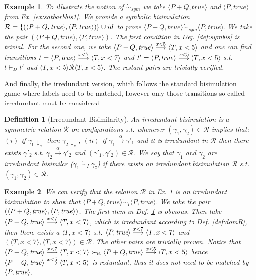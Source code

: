 \documentclass[copyright,creativecommons]{eptcs}
\newcommand{\true}{{\it true}}
\newcommand{\rrarrow}{\longrightarrow}
\newcommand{\pairccp}[2]{\langle #1,#2 \rangle}
\newcommand{\trans}[1]{\stackrel{#1}{\rrarrow}}
\newtheorem{definition}{Definition}
\newtheorem{example}{Example}
\newcommand{\R}{\mathcal{R}}
\newcommand{\A}{\alpha}
\newcommand{\conf}[2]{\pairccp{#1}{#2}}
\newcommand{\deriv}{\vdash_D}
\newcommand{\domR}{\succ_{\R}}
\newcommand{\irrbis}{\dot{\sim}_{I}}
\newcommand{\symbis}{\dot{\sim}_{sym}}
\begin{document}
\begin{example}\label{ex:symbis1}
\emph{To illustrate the notion of $\symbis$ we take $\pairccp{P+Q}{true}$ and $\pairccp{P}{true}$ from  Ex. \ref{ex:satbarbbis1}. We provide a symbolic bisimulation $\mathcal{R} = \{(\pairccp{P + Q}{\true},\pairccp{P}{\true})\} \cup id$ to prove $\pairccp{P+Q}{true} \symbis \pairccp{P}{true}.$  We take the pair $(\pairccp{P+Q}{true},\pairccp{P}{true})$. The first condition in Def. \ref{def:symbis} is trivial. For the second one, we take $\pairccp{P + Q}{\true} \trans{x<5} \pairccp{T}{x<5}$ and one can find transitions $t = \pairccp{P}{\true} \trans{x<7} \pairccp{T}{x<7}$ and $t' = \pairccp{P}{\true} \trans{x<5} \pairccp{T}{x<5}$ s.t. $t \deriv t'$ and $\conf{T}{x<5} \R \conf{T}{x<5}$. The restant pairs are trivially verified.}
\end{example}





And finally, the irredundant version, which follows the standard bisimulation
game where labels need to be matched, however only those transitions
so-called irredundant must be considered.

\begin{definition}[Irredundant Bisimilarity]
\label{def:irrbis}
An irredundant bisimulation is a symmetric relation
$\R$ on configurations s.t. whenever
$(\gamma_1, \gamma_2) \in \R$ implies that:
$(i)$ if $\gamma_1 \downarrow_e$ then $\gamma_2 \downarrow_e$,
$(ii)$ if $\gamma_1 \trans{\A} \gamma'_1$ and it is irredundant in $\R$ then there exists $\gamma'_2$ s.t. $\gamma_2 \trans{\A} \gamma'_2$ and $(\gamma'_1, \gamma'_2) \in \R$.
We say that $\gamma_1$ and $\gamma_2$ are irredundant bisimilar ($\gamma_1 \; \irrbis \; \gamma_2$) if there exists an irredundant bisimulation $\R$ s.t.
$(\gamma_1,\gamma_2) \in \mathcal{R}$.
\end{definition}

\begin{example}\label{ex:irrbis1}
\emph{We can verify that the relation $\mathcal{R}$ in Ex. \ref{ex:symbis1} is an irredundant bisimulation to show that $\pairccp{P+Q}{true} \irrbis \pairccp{P}{true}.$  We take the pair $(\pairccp{P + Q}{\true},\pairccp{P}{\true})$. The first item in Def. \ref{def:irrbis} is obvious. Then take $\pairccp{P + Q}{\true} \trans{x<7} \pairccp{T}{x<7}$, which is irredundant according to Def. \ref{def:domR}, then there exists a $\pairccp{T}{x<7}$ s.t. $\pairccp{P}{\true} \trans{x<7} \pairccp{T}{x<7}$ and $(\pairccp{T}{x<7},\pairccp{T}{x<7}) \in \mathcal{R}$. The other pairs are trivially proven. Notice that $\pairccp{P + Q}{\true} \trans{x<7} \pairccp{T}{x<7} \domR \pairccp{P + Q}{\true} \trans{x<5} \pairccp{T}{x<5}$ hence $\pairccp{P + Q}{\true} \trans{x<5} \pairccp{T}{x<5}$ is redundant, thus it does not need to be matched by $\conf{P}{\true}$.}
\end{example}
\end{document}
